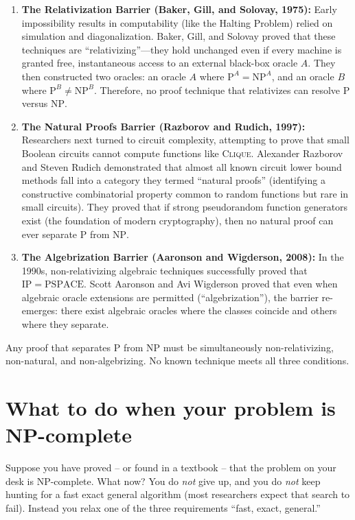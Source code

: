 \begin{enumerate}
  \item \textbf{The Relativization Barrier (Baker, Gill, and Solovay, 1975):}
        Early impossibility results in computability (like the Halting Problem) relied on simulation and diagonalization. Baker, Gill, and Solovay proved that these techniques are ``relativizing''---they hold unchanged even if every machine is granted free, instantaneous access to an external black-box oracle $A$. They then constructed two oracles: an oracle $A$ where $\mathrm{P}^A = \mathrm{NP}^A$, and an oracle $B$ where $\mathrm{P}^B \neq \mathrm{NP}^B$. Therefore, no proof technique that relativizes can resolve $\mathrm{P}$ versus $\mathrm{NP}$.
  \item \textbf{The Natural Proofs Barrier (Razborov and Rudich, 1997):}
        Researchers next turned to circuit complexity, attempting to prove that small Boolean circuits cannot compute functions like \textsc{Clique}. Alexander Razborov and Steven Rudich demonstrated that almost all known circuit lower bound methods fall into a category they termed ``natural proofs'' (identifying a constructive combinatorial property common to random functions but rare in small circuits). They proved that if strong pseudorandom function generators exist (the foundation of modern cryptography), then no natural proof can ever separate $\mathrm{P}$ from $\mathrm{NP}$. 
  \item \textbf{The Algebrization Barrier (Aaronson and Wigderson, 2008):}
        In the 1990s, non-relativizing algebraic techniques successfully proved that $\mathrm{IP} = \mathrm{PSPACE}$. Scott Aaronson and Avi Wigderson proved that even when algebraic oracle extensions are permitted (``algebrization''), the barrier re-emerges: there exist algebraic oracles where the classes coincide and others where they separate.
\end{enumerate}

Any proof that separates $\mathrm{P}$ from $\mathrm{NP}$ must be simultaneously non-relativizing, non-natural, and non-algebrizing. No known technique meets all three conditions.

\section{What to do when your problem is NP-complete}

Suppose you have proved -- or found in a textbook -- that the problem on your
desk is NP-complete. What now? You do \emph{not} give up, and you do \emph{not}
keep hunting for a fast exact general algorithm (most researchers expect that
search to fail). Instead you relax one of the three requirements ``fast, exact,
general.''

